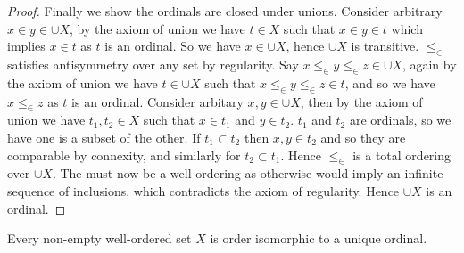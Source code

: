 \documentclass[]{article}
\begin{document}
\begin{proof}
	Finally we show the ordinals are closed under unions. Consider arbitrary $x \in y \in \cup X$, by the axiom of union we have  $t \in X$ such that $x \in y \in t$ which implies $x \in t$ as $t$ is an ordinal. So we have $x \in \cup X$, hence $\cup X$ is transitive. $\leq_\in$ satisfies antisymmetry over any set by regularity. Say $x \leq_\in y \leq_\in z \in \cup X$, again by the axiom of union we have $t \in \cup X$ such that $x \leq_\in y \leq_\in z \in t$, and so we have $x \leq_\in z$ as $t$ is an ordinal. Consider arbitary $x, y \in \cup X$, then by the axiom of union we have $t_1, t_2 \in X$ such that $x \in t_1$ and $y \in t_2$. $t_1$ and $t_2$ are ordinals, so we have one is a subset of the other. If $t_1 \subset t_2$ then $x, y \in t_2$ and so they are comparable by connexity, and similarly for $t_2 \subset t_1$. Hence $\leq_\in$ is a total ordering over $\cup X$. The must now be a well ordering as otherwise would imply an infinite sequence of inclusions, which contradicts the axiom of regularity. Hence $\cup X$ is an ordinal.
 \end{proof}

 \begin{thm} \label{thm:ordinals-canonical-well-ordering}
	Every non-empty well-ordered set $X$ is order isomorphic to a unique ordinal. 
 \end{thm}
\end{document}
